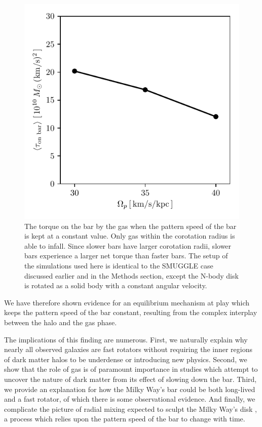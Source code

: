 \documentclass{natureprintstyle}
\begin{document}
\begin{figure}[h]
\centering
\includegraphics{fig/fig4.pdf}
\caption{The torque on the bar by the gas when the pattern speed of the bar is
kept at a constant value. Only gas within the corotation radius is able to
infall. Since slower bars have larger corotation radii, slower bars experience
a larger net torque than faster bars. The setup of the simulations used here
is identical to the SMUGGLE case discussed earlier and in the Methods section,
except the N-body disk is rotated as a solid body with a constant angular
velocity.}\label{fig:equil}
\end{figure}

We have therefore shown evidence for an equilibrium mechanism at play which
keeps the pattern speed of the bar constant, resulting from the complex
interplay between the halo and the gas phase.

The implications of this finding are numerous. First, we naturally explain why
nearly all observed galaxies are fast rotators without requiring the inner
regions of dark matter halos to be underdense\cite{1998ApJ...493L...5D,
2000ApJ...543..704D} or introducing new physics.\cite{2021MNRAS.503.2833R,
2021MNRAS.508..926R} Second, we show that the role of gas is of paramount
importance in studies which attempt to uncover the nature of dark matter from
its effect of slowing down the bar.\cite{2021MNRAS.500.4710C,
2021MNRAS.505.2412C} Third, we provide an explanation for how the Milky Way's
bar could be both long-lived and a fast rotator, of which there is some
observational evidence.\cite{2019MNRAS.490.4740B} And finally, we complicate
the picture of radial mixing expected to sculpt the Milky Way's disk
\cite{2012MNRAS.420..913B, 2015ApJ...808..132H}, a process which relies upon
the pattern speed of the bar to change with time.
\end{document}
